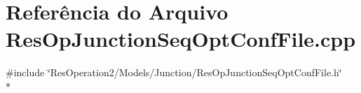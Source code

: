 \section{Referência do Arquivo Res\+Op\+Junction\+Seq\+Opt\+Conf\+File.\+cpp}
\label{_res_op_junction_seq_opt_conf_file_8cpp}
{\ttfamily \#include \char`\"{}Res\+Operation2/\+Models/\+Junction/\+Res\+Op\+Junction\+Seq\+Opt\+Conf\+File.\+h\char`\"{}}\\*
